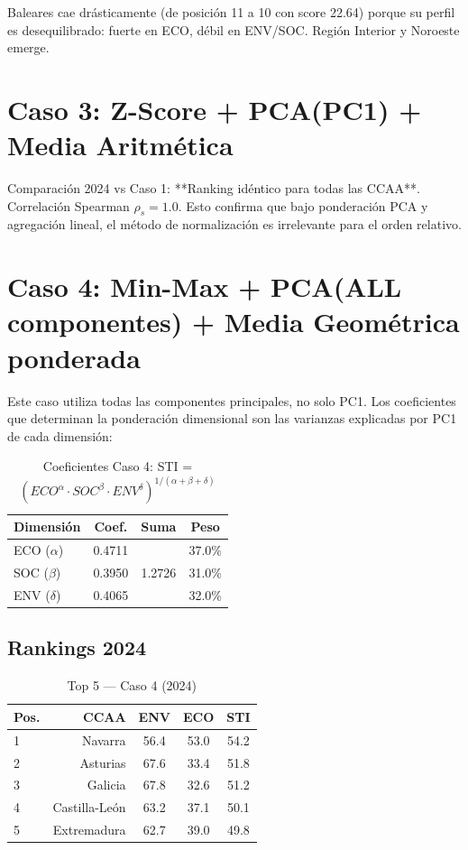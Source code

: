 Baleares cae drásticamente (de posición 11 a 10 con score 22.64) porque su perfil es desequilibrado: fuerte en ECO, débil en ENV/SOC. Región Interior y Noroeste emerge.

\section{Caso 3: Z-Score + PCA(PC1) + Media Aritmética}

Comparación 2024 vs Caso 1: **Ranking idéntico para todas las CCAA**. Correlación Spearman $\rho_s = 1.0$. Esto confirma que bajo ponderación PCA y agregación lineal, el método de normalización es irrelevante para el orden relativo.

\section{Caso 4: Min-Max + PCA(ALL componentes) + Media Geométrica ponderada}

Este caso utiliza todas las componentes principales, no solo PC1. Los coeficientes que determinan la ponderación dimensional son las varianzas explicadas por PC1 de cada dimensión:

\begin{table}[H]
    \centering
    \begin{tabular}{lccc}
        \toprule
        \textbf{Dimensión} & \textbf{Coef.} & \textbf{Suma} & \textbf{Peso} \\
        \midrule
        ECO ($\alpha$) & 0.4711 & & 37.0\% \\
        SOC ($\beta$) & 0.3950 & 1.2726 & 31.0\% \\
        ENV ($\delta$) & 0.4065 & & 32.0\% \\
        \bottomrule
    \end{tabular}
    \caption{Coeficientes Caso 4: STI = $(ECO^\alpha \cdot SOC^\beta \cdot ENV^\delta)^{1/(\alpha+\beta+\delta)}$}
\end{table}

\subsection{Rankings 2024}

\begin{table}[H]
    \centering
    \small
    \begin{tabular}{lrccc}
        \toprule
        \textbf{Pos.} & \textbf{CCAA} & \textbf{ENV} & \textbf{ECO} & \textbf{STI} \\
        \midrule
        1 & Navarra & 56.4 & 53.0 & 54.2 \\
        2 & Asturias & 67.6 & 33.4 & 51.8 \\
        3 & Galicia & 67.8 & 32.6 & 51.2 \\
        4 & Castilla-León & 63.2 & 37.1 & 50.1 \\
        5 & Extremadura & 62.7 & 39.0 & 49.8 \\
        \bottomrule
    \end{tabular}
    \caption{Top 5 — Caso 4 (2024)}
\end{table}

